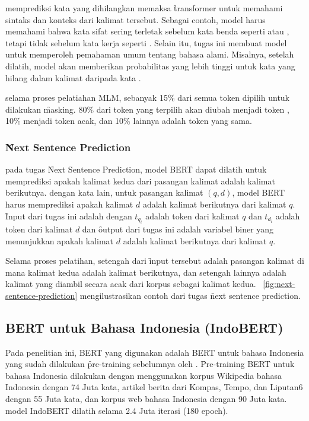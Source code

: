 	memprediksi kata yang dihilangkan memaksa \f{transformer} untuk memahami sintaks dan konteks dari kalimat tersebut. Sebagai contoh, model harus memahami bahwa kata sifat  sering terletak sebelum kata benda seperti  atau , tetapi tidak sebelum kata kerja seperti . Selain itu, tugas ini membuat model untuk memperoleh pemahaman umum tentang bahasa alami. Misalnya, setelah dilatih, model akan memberikan probabilitas yang lebih tinggi untuk kata  yang hilang dalam kalimat  daripada kata .

	selama proses pelatiahan MLM, sebanyak 15\% dari semua token dipilih untuk dilakukan \f{masking}. 80\% dari token yang terpilih akan diubah menjadi token \code{[MASK]}, 10\% menjadi token acak, dan 10\% lainnya adalah token yang sama.

	\subsubsection{\f{Next Sentence Prediction}}
	\label{sec:next-sentence-prediction}

	pada tugas \f{Next Sentence Prediction}, model BERT dapat dilatih untuk memprediksi apakah kalimat kedua dari pasangan kalimat adalah kalimat berikutnya. dengan kata lain, untuk pasangan kalimat $(q, d)$, model BERT harus memprediksi apakah kalimat $d$ adalah kalimat berikutnya dari kalimat $q$. \f{Input} dari tugas ini adalah  dengan $t_{q_i}$ adalah token dari kalimat $q$ dan $t_{d_i}$ adalah token dari kalimat $d$ dan \f{output} dari tugas ini adalah variabel biner yang menunjukkan apakah kalimat $d$ adalah kalimat berikutnya dari kalimat $q$.
	
	Selama proses pelatihan, setengah dari \f{input} tersebut adalah pasangan kalimat di mana kalimat kedua adalah kalimat berikutnya, dan setengah lainnya adalah kalimat yang diambil secara acak dari korpus sebagai kalimat kedua. \pic~\ref{fig:next-sentence-prediction} mengilustrasikan contoh dari tugas \f{next sentence prediction}.

	
	\subsection{BERT untuk Bahasa Indonesia (IndoBERT)}

	Pada penelitian ini, BERT yang digunakan adalah BERT untuk bahasa Indonesia yang sudah dilakukan \f{pre-training} sebelumnya oleh \cite{indobert}. \f{Pre-training} BERT untuk bahasa Indonesia dilakukan dengan menggunakan korpus Wikipedia bahasa Indonesia dengan 74 Juta kata, artikel berita dari Kompas, Tempo, dan Liputan6 dengan 55 Juta kata, dan korpus web bahasa Indonesia dengan 90 Juta kata. model IndoBERT dilatih selama 2.4 Juta iterasi (180 epoch).

